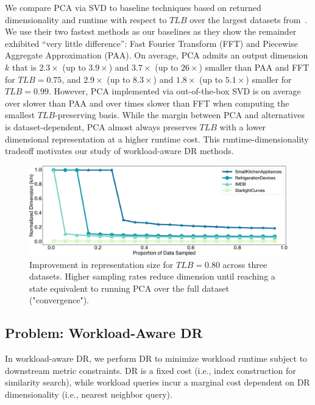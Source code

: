 We compare PCA via SVD to baseline techniques based on returned dimensionality and runtime with respect to $TLB$ over the largest datasets from~\cite{keogh-study}. 
We use their two fastest methods as our baselines as they show the remainder exhibited ``very little difference'': Fast Fourier Transform (FFT) and Piecewise Aggregate Approximation (PAA).
On average, PCA admits an output dimension $k$ that is $2.3\times$ (up to $3.9\times$) and $3.7\times$ (up to $26\times$) smaller than PAA and FFT for $TLB = 0.75$, and $2.9\times$ (up to $8.3\times$) and $1.8\times$ (up to $5.1\times$) smaller for $TLB = 0.99$.
However, PCA implemented via out-of-the-box SVD is on average over  slower than PAA and over  times slower than FFT when computing the smallest $TLB$-preserving basis.
While the margin between PCA and alternatives is dataset-dependent, PCA almost always preserves $TLB$ with a lower dimensional representation at a higher runtime cost.
This runtime-dimensionality tradeoff motivates our study of workload-aware DR methods. 

\begin{figure}
\includegraphics[width=\linewidth]{figs/progressive.pdf}
\caption[]{ Improvement in representation size for  $TLB = 0.80$ across three datasets. Higher sampling rates reduce dimension until reaching a state equivalent to running PCA over the full dataset ("convergence").}
\label{fig:progressive}
\end{figure}


\subsection{Problem: Workload-Aware DR}
\label{subsec:wadr}

In workload-aware DR, we perform DR to minimize workload runtime subject to downstream metric constraints.
DR is a fixed cost (i.e., index construction for similarity search), while workload queries incur a marginal cost dependent on DR dimensionality (i.e., nearest neighbor query). 

